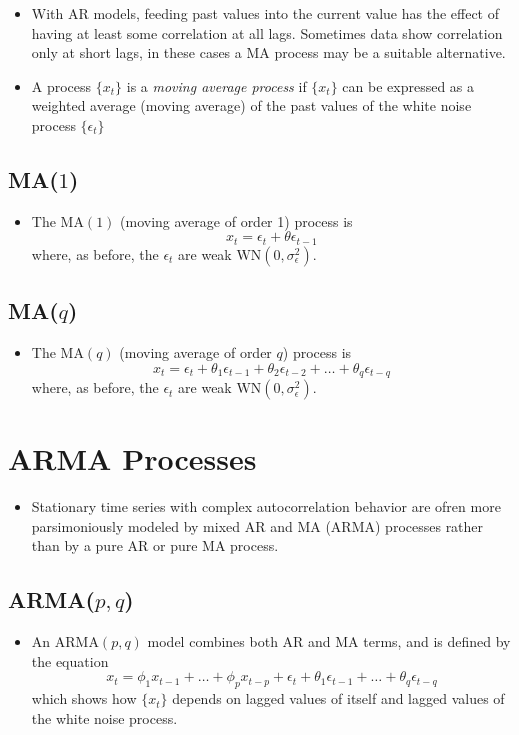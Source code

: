 \documentclass[11pt]{article}
\begin{document}
\begin{itemize}
    \item With AR models, feeding past values into the current value has the effect of having 
    at least some correlation at all lags. Sometimes data show correlation only at short lags, 
    in these cases a MA process may be a suitable alternative.
    \item A process $\{x_t\}$ is a \textit{moving average process} if $\{x_t\}$ can be 
    expressed as a weighted average (moving average) of the past values of the white noise 
    process $\{\epsilon_t\}$
\end{itemize}

\subsection{MA($1$)}
\begin{itemize}
    \item The $\text{MA}(1)$ (moving average of order 1) process is 
    \[x_t = \epsilon_t + \theta \epsilon_{t-1}\]
    where, as before, the $\epsilon_t$ are weak $\text{WN}(0, \sigma_{\epsilon}^{2})$.
\end{itemize}

\subsection{MA($q$)}
\begin{itemize}
    \item The $\text{MA}(q)$ (moving average of order $q$) process is 
    \[x_t = \epsilon_t + \theta_1 \epsilon_{t-1} + \theta_2 \epsilon_{t-2} + \hdots + \theta_q \epsilon_{t-q} \]
    where, as before, the $\epsilon_t$ are weak $\text{WN}(0, \sigma_{\epsilon}^{2})$.
\end{itemize}

\section{ARMA Processes}
\begin{itemize}
    \item Stationary time series with complex autocorrelation behavior are ofren more 
    parsimoniously modeled by mixed AR and MA (ARMA) processes rather than by a pure AR or pure
    MA process.
\end{itemize}

\subsection{ARMA($p,q$)}
\begin{itemize}
    \item An $\text{ARMA}(p,q)$ model combines both AR and MA terms, and is defined by the 
    equation 
    \[x_t = \phi_1 x_{t-1} + \hdots + \phi_p x_{t-p} + \epsilon_t + \theta_1 \epsilon_{t-1} + 
    \hdots + \theta_q \epsilon_{t-q}\]
    which shows how $\{x_t\}$ depends on lagged values of itself and lagged values of the white
    noise process.
\end{itemize}
\end{document}
